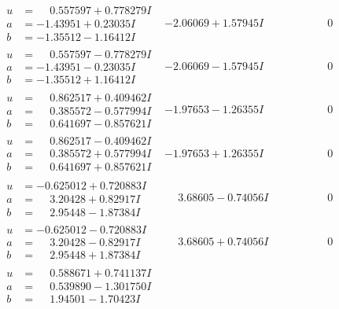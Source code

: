 \documentclass[1p]{elsarticle_modified}
\theoremstyle{definition}
\begin{document}
$$\begin{array}{c|c|c}
\begin{aligned}
u &= \phantom{-}0.557597 + 0.778279 I \\
a &= -1.43951 + 0.23035 I \\
b &= -1.35512 - 1.16412 I\end{aligned}
 & -2.06069 + 1.57945 I & \phantom{-0.000000 } 0 \\ \hline\begin{aligned}
u &= \phantom{-}0.557597 - 0.778279 I \\
a &= -1.43951 - 0.23035 I \\
b &= -1.35512 + 1.16412 I\end{aligned}
 & -2.06069 - 1.57945 I & \phantom{-0.000000 } 0 \\ \hline\begin{aligned}
u &= \phantom{-}0.862517 + 0.409462 I \\
a &= \phantom{-}0.385572 - 0.577994 I \\
b &= \phantom{-}0.641697 - 0.857621 I\end{aligned}
 & -1.97653 - 1.26355 I & \phantom{-0.000000 } 0 \\ \hline\begin{aligned}
u &= \phantom{-}0.862517 - 0.409462 I \\
a &= \phantom{-}0.385572 + 0.577994 I \\
b &= \phantom{-}0.641697 + 0.857621 I\end{aligned}
 & -1.97653 + 1.26355 I & \phantom{-0.000000 } 0 \\ \hline\begin{aligned}
u &= -0.625012 + 0.720883 I \\
a &= \phantom{-}3.20428 + 0.82917 I \\
b &= \phantom{-}2.95448 - 1.87384 I\end{aligned}
 & \phantom{-}3.68605 - 0.74056 I & \phantom{-0.000000 } 0 \\ \hline\begin{aligned}
u &= -0.625012 - 0.720883 I \\
a &= \phantom{-}3.20428 - 0.82917 I \\
b &= \phantom{-}2.95448 + 1.87384 I\end{aligned}
 & \phantom{-}3.68605 + 0.74056 I & \phantom{-0.000000 } 0 \\ \hline\begin{aligned}
u &= \phantom{-}0.588671 + 0.741137 I \\
a &= \phantom{-}0.539890 - 1.301750 I \\
b &= \phantom{-}1.94501 - 1.70423 I\end{aligned}

\end{array}$$
\end{document}
